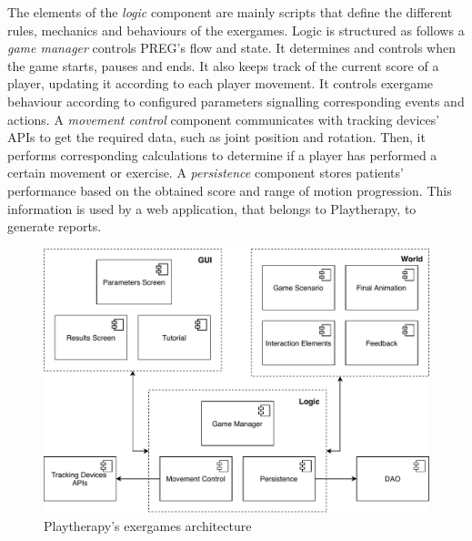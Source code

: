The elements of the \emph{logic} component are mainly scripts that define the different rules, mechanics and behaviours of the exergames. Logic is structured as follows a \emph{game manager} controls \ac{PREG}'s flow and state. It determines and controls when the game starts, pauses and ends. It also keeps track of the current score of a player, updating it according to each player movement. It controls exergame behaviour according to configured parameters signalling corresponding events and actions. A \emph{movement control} component communicates with tracking devices' APIs to get the required data, such as joint position and rotation. Then, it performs corresponding calculations to determine if a player has performed a certain movement or exercise. A \emph{persistence} component stores patients' performance based on the obtained score and range of motion progression. This information is used by a web application, that belongs to Playtherapy, to generate reports.

\begin{figure}[h]
\centering
\includegraphics[width=.9\linewidth]{gfx/playtherapy/minigame_architecture}
\caption{Playtherapy's exergames architecture}
\label{fig:mg_arch}
\end{figure}

